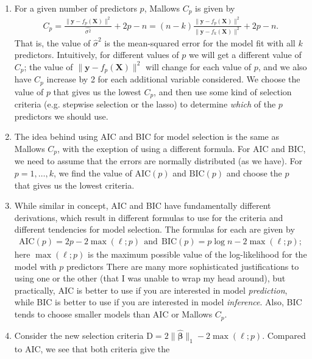 \documentclass[10pt]{article}
\begin{document}
\begin{enumerate}
    \item For a given number of predictors \(p\), Mallows \(C_p\) is given by 
    \begin{align*}
        C_p
        = \frac{\| \mathbf{y} - f_p(\mathbf{X}) \|^2}{\hat{\sigma^2}} + 2p - n
        = (n - k)\frac{\| \mathbf{y} - f_p(\mathbf{X}) \|^2}{\| \mathbf{y} - f_k(\mathbf{X}) \|^2} + 2p - n.
    \end{align*}
    That is, the value of \(\hat{\sigma}^2\) is the mean-squared error for the model fit with all \(k\) predictors. 
    Intuitively, for different values of \(p\) we will get a different value of \(C_p\); the value of \(\| \mathbf{y} - f_p(\mathbf{X}) \|^2\) will change 
    for each value of \(p\), and we also have \(C_p\) increase by 2 for each additional variable considered. 
    We choose the value of \(p\) that gives us the lowest \(C_p\), and then use some kind of selection criteria (e.g. stepwise selection or the lasso) 
    to determine \textsl{which} of the \(p\) predictors we should use. 
    \item The idea behind using AIC and BIC for model selection is the same as Mallows \(C_p\), with the exeption of using a different formula. For AIC and BIC,
    we need to assume that the errors are normally distributed (as we have). For \(p = 1, \ldots, k\), we find the value of \(\mathrm{AIC}(p)\) and \(\mathrm{BIC}(p)\)
    and choose the \(p\) that gives us the lowest criteria. 
    \item While similar in concept, AIC and BIC have fundamentally different derivations, which result in different formulas to use for the criteria 
    and different tendencies for model selection. The formulas for each are given by 
    \begin{align*}
        \mathrm{AIC}(p)
        = 2p - 2 \max(\ell;p)
        ~~\text{and}~~
        \mathrm{BIC}(p)
        = p \log n - 2 \max(\ell;p);
    \end{align*}
    here \(\max(\ell;p)\) is the maximum possible value of the log-likelihood for the model with \(p\) predictors
    There are many more sophisticated justifications to using one or the other (that I was unable to wrap my head around), but practically, AIC is 
    better to use if you are interested in model \textsl{prediction}, while BIC is better to use if you are interested in model \textsl{inference}. 
    Also, BIC tends to choose smaller models than AIC or Mallows \(C_p\).
    \item Consider the new selection criteria \(\mathrm{D} = 2 \| \hat{\bm{\beta}} \|_1 - 2 \max(\ell;p)\). Compared to AIC, we see that both criteria give the 

\end{enumerate}
\end{document}
